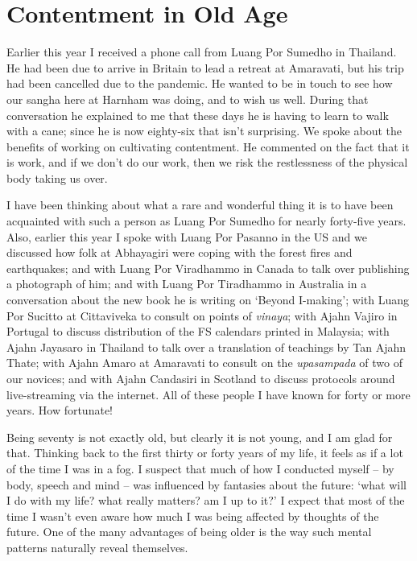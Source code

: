 \section{Contentment in Old Age}

Earlier this year I received a phone call from Luang Por Sumedho in
Thailand. He had been due to arrive in Britain to lead a retreat at
Amaravati, but his trip had been cancelled due to the pandemic. He
wanted to be in touch to see how our sangha here at Harnham was doing,
and to wish us well. During that conversation he explained to me that
these days he is having to learn to walk with a cane; since he is now
eighty-six that isn't surprising. We spoke about the benefits of working
on cultivating contentment. He commented on the fact that it is work,
and if we don't do our work, then we risk the restlessness of the
physical body taking us over.

I have been thinking about what a rare and wonderful thing it is to have
been acquainted with such a person as Luang Por Sumedho for nearly
forty-five years. Also, earlier this year I spoke with Luang Por Pasanno
in the US and we discussed how folk at Abhayagiri were coping with the
forest fires and earthquakes; and with Luang Por Viradhammo in Canada to
talk over publishing a photograph of him; and with Luang Por Tiradhammo
in Australia in a conversation about the new book he is writing on
`Beyond I-making'; with Luang Por Sucitto at Cittaviveka to consult on
points of \emph{vinaya}; with Ajahn Vajiro in Portugal to discuss
distribution of the FS calendars printed in Malaysia; with Ajahn
Jayasaro in Thailand to talk over a translation of teachings by Tan
Ajahn Thate; with Ajahn Amaro at Amaravati to consult on the
\emph{upasampada} of two of our novices; and with Ajahn Candasiri in
Scotland to discuss protocols around \mbox{live-streaming} via the internet.
All of these people I have known for forty or more years. How fortunate!

Being seventy is not exactly old, but clearly it is not young, and I am
glad for that. Thinking back to the first thirty or forty years of my
life, it feels as if a lot of the time I was in a fog. I suspect that
much of how I conducted myself -- by body, speech and mind -- was
influenced by fantasies about the future: `what will I do with my life?
what really matters? am I up to it?' I expect that most of the time I
wasn't even aware how much I was being affected by thoughts of the
future. One of the many advantages of being older is the way such mental
patterns naturally reveal themselves.

